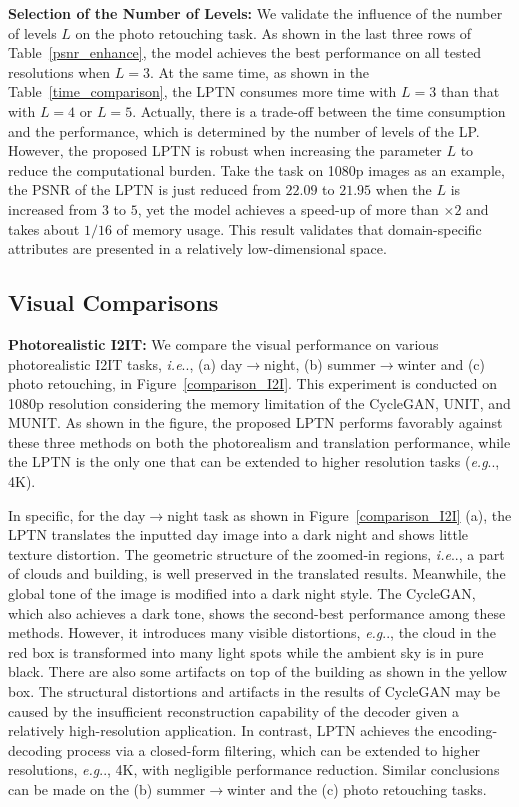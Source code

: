 \documentclass[10pt,twocolumn,letterpaper]{article}
\makeatletter
\DeclareRobustCommand\onedot{\futurelet\@let@token\@onedot}
\def\@onedot{\ifx\@let@token.\else.\null\fi\xspace}
\def\eg{\emph{e.g}\onedot} \def\Eg{\emph{E.g}\onedot}
\def\ie{\emph{i.e}\onedot} \def\Ie{\emph{I.e}\onedot}
\makeatother
\begin{document}
	\noindent\textbf{Selection of the Number of Levels: } We validate the influence of the number of levels $L$ on the photo retouching task. As shown in the last three rows of Table~\ref{psnr_enhance}, the model achieves the best performance on all tested resolutions when $L=3$. At the same time, as shown in the Table~\ref{time_comparison}, the LPTN consumes more time with $L=3$ than that with $L=4$ or $L=5$. Actually, there is a trade-off between the time consumption and the performance, which is determined by the number of levels of the LP. However, the proposed LPTN is robust when increasing the parameter $L$ to reduce the computational burden. Take the task on 1080p images as an example, the PSNR of the LPTN is just reduced from $22.09$ to $21.95$ when the $L$ is increased from $3$ to $5$, yet the model achieves a speed-up of more than $\times 2$ and takes about $1/16$ of memory usage. This result validates that domain-specific attributes are presented in a relatively low-dimensional space.
	
	\subsection{Visual Comparisons}
	\label{visual_comp}
	
	\noindent\textbf{Photorealistic I2IT: } We compare the visual performance on various photorealistic I2IT tasks, \ie, (a) day$\rightarrow$night, (b) summer$\rightarrow$winter and (c) photo retouching, in Figure~\ref{comparison_I2I}. This experiment is conducted on 1080p resolution considering the memory limitation of the CycleGAN, UNIT, and MUNIT. As shown in the figure, the proposed LPTN performs favorably against these three methods on both the photorealism and translation performance, while the LPTN is the only one that can be extended to higher resolution tasks (\eg, 4K).
	
	In specific, for the day$\rightarrow$night task as shown in Figure~\ref{comparison_I2I} (a), the LPTN translates the inputted day image into a dark night and shows little texture distortion. The geometric structure of the zoomed-in regions, \ie, a part of clouds and building, is well preserved in the translated results. Meanwhile, the global tone of the image is modified into a dark night style. The CycleGAN, which also achieves a dark tone, shows the second-best performance among these methods. However, it introduces many visible distortions, \eg, the cloud in the red box is transformed into many light spots while the ambient sky is in pure black. There are also some artifacts on top of the building as shown in the yellow box. The structural distortions and artifacts in the results of CycleGAN may be caused by the insufficient reconstruction capability of the decoder given a relatively high-resolution application. In contrast, LPTN achieves the encoding-decoding process via a closed-form filtering, which can be extended to higher resolutions, \eg, 4K, with negligible performance reduction. Similar conclusions can be made on the (b) summer$\rightarrow$winter and the (c) photo retouching tasks.
	
\end{document}
